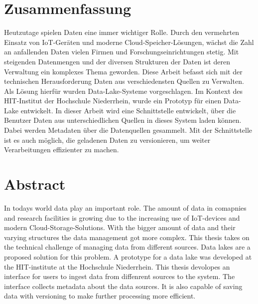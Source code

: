 \section*{Zusammenfassung}

Heutzutage spielen Daten eine immer wichtiger Rolle.
Durch den vermehrten Einsatz von IoT-Geräten und moderne Cloud-Speicher-Lösungen, wächst die Zahl an anfallenden Daten vielen Firmen und Forschungseinrichtungen stetig.
Mit steigenden Datenmengen und der diversen Strukturen der Daten ist deren Verwaltung ein komplexes Thema geworden.
Diese Arbeit befasst sich mit der technischen Herausforderung Daten aus verschiedensten Quellen zu Verwalten.
Als Lösung hierfür wurden Data-Lake-Systeme vorgeschlagen.
Im Kontext des HIT-Institut der Hochschule Niederrhein, wurde ein Prototyp für einen Data-Lake entwickelt.
In dieser Arbeit wird eine Schnittstelle entwickelt, über die Benutzer Daten aus unterschiedlichen Quellen in dieses System laden können.
Dabei werden Metadaten über die Datenquellen gesammelt.
Mit der Schnittstelle ist es auch möglich, die geladenen Daten zu versionieren, um weiter Verarbeitungen effizienter zu machen.

\section*{Abstract}

In todays world data play an important role.
The amount of data in comapnies and research facilities is growing due to the increasing use of IoT-devices and modern Cloud-Storage-Solutions.
With the bigger amount of data and their varying structures the data management got more complex.
This thesis takes on the technical challenge of managing data from different sources.
Data lakes are a proposed solution for this problem.
A prototype for a data lake was developed at the HIT-institute at the Hochschule Niederrhein.
This thesis devolopes an interface for users to ingest data from diffenrent sources to the system.
The interface collects metadata about the data sources.
It is also capable of saving data with versioning to make further processing more efficient.